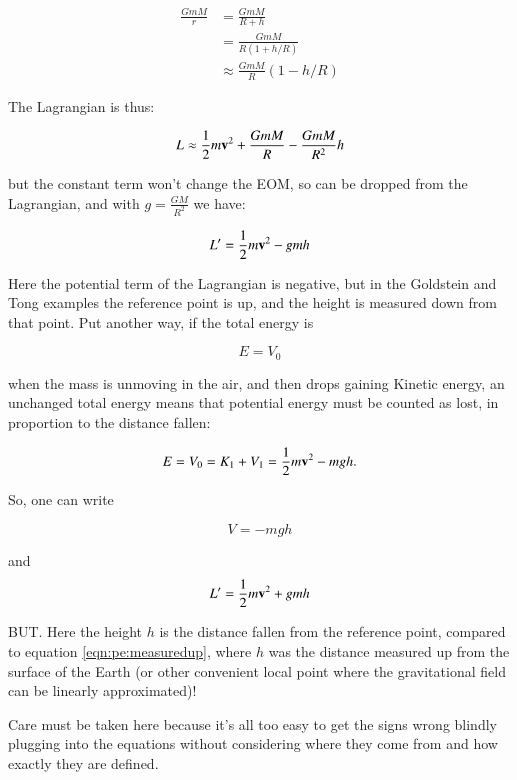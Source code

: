 \begin{align*}
\frac{GmM}{r} 
&= \frac{GmM}{R + h} \\
&= \frac{GmM}{R(1 + h/R)} \\
&\approx \frac{GmM}{R} (1 - h/R)
\end{align*}

The Lagrangian is thus:

\begin{equation*}
L \approx \frac{1}{2} m \mathbf{v}^2 + \frac{GmM}{R} -\frac{GmM}{R^2} h
\end{equation*}

but the constant term won't change the EOM, so can be dropped from the Lagrangian, and with $g=\frac{GM}{R^2}$ we have:

\begin{equation}\label{eqn:pe:measuredup}
L' = \frac{1}{2} m \mathbf{v}^2 - g m h
\end{equation}

Here the potential term of the Lagrangian is negative, but in the Goldstein and Tong examples the reference point is up, and the height is measured down
from that point.  Put another way, if the total energy is 

\begin{equation*}
E = V_0
\end{equation*}

when the mass is unmoving in the air, and then drops gaining Kinetic energy, an unchanged total energy means that potential energy must be counted as lost, in proportion to the distance fallen:

\begin{equation*}
E = V_0 = K_1 + V_1 = \frac{1}{2} m \mathbf{v}^2 - m g h.
\end{equation*}

So, one can write

\begin{equation*}
V = -m g h
\end{equation*}

and 
\begin{equation}\label{eqn:pe:measureddown}
L' = \frac{1}{2} m \mathbf{v}^2 + g m h
\end{equation}

BUT.  Here the height $h$ is the distance fallen from the reference point, compared to equation \ref{eqn:pe:measuredup}, where $h$ was the distance measured up from the surface of the Earth (or other convenient local point where the gravitational field can be linearly approximated)!

Care must be taken here because it's all too easy to get the signs wrong blindly plugging into the equations without considering where they come from and how exactly they are defined.

%               
